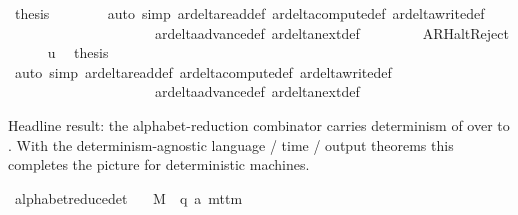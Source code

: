 \begin{isabellebody}
\ {\isacharquery}{\kern0pt}thesis\isanewline
\ \ \ \ \ \ \isamarkupfalse%
\ {\isacharparenleft}{\kern0pt}auto\ simp{\isacharcolon}{\kern0pt}\ ar{\isacharunderscore}{\kern0pt}delta{\isacharunderscore}{\kern0pt}read{\isacharunderscore}{\kern0pt}def\ ar{\isacharunderscore}{\kern0pt}delta{\isacharunderscore}{\kern0pt}compute{\isacharunderscore}{\kern0pt}def\ ar{\isacharunderscore}{\kern0pt}delta{\isacharunderscore}{\kern0pt}write{\isacharunderscore}{\kern0pt}def\isanewline
\ \ \ \ \ \ \ \ \ \ \ \ \ \ \ \ \ \ \ \ \ ar{\isacharunderscore}{\kern0pt}delta{\isacharunderscore}{\kern0pt}advance{\isacharunderscore}{\kern0pt}def\ ar{\isacharunderscore}{\kern0pt}delta{\isacharunderscore}{\kern0pt}next{\isacharunderscore}{\kern0pt}def{\isacharparenright}{\kern0pt}\isanewline
\ \ \isamarkupfalse%
\isanewline
\ \ \ \ \isamarkupfalse%
\ AR{\isacharunderscore}{\kern0pt}HaltReject\isanewline
\ \ \ \ \isamarkupfalse%
\ u{}\ \isamarkupfalse%
\ {\isacharquery}{\kern0pt}thesis\isanewline
\ \ \ \ \ \ \isamarkupfalse%
\ {\isacharparenleft}{\kern0pt}auto\ simp{\isacharcolon}{\kern0pt}\ ar{\isacharunderscore}{\kern0pt}delta{\isacharunderscore}{\kern0pt}read{\isacharunderscore}{\kern0pt}def\ ar{\isacharunderscore}{\kern0pt}delta{\isacharunderscore}{\kern0pt}compute{\isacharunderscore}{\kern0pt}def\ ar{\isacharunderscore}{\kern0pt}delta{\isacharunderscore}{\kern0pt}write{\isacharunderscore}{\kern0pt}def\isanewline
\ \ \ \ \ \ \ \ \ \ \ \ \ \ \ \ \ \ \ \ \ ar{\isacharunderscore}{\kern0pt}delta{\isacharunderscore}{\kern0pt}advance{\isacharunderscore}{\kern0pt}def\ ar{\isacharunderscore}{\kern0pt}delta{\isacharunderscore}{\kern0pt}next{\isacharunderscore}{\kern0pt}def{\isacharparenright}{\kern0pt}\isanewline
\ \ \isamarkupfalse%
\isanewline
{}\isamarkupfalse%
%
\endisatagproof
{\isafoldproof}%
%
\isadelimproof
%
\endisadelimproof
%
\begin{isamarkuptext}%
Headline result: the alphabet-reduction combinator carries
  determinism of  over to .  With the
  determinism-agnostic language / time / output theorems this completes
  the picture for deterministic machines.%
\end{isamarkuptext}\isamarkuptrue%
\isamarkupfalse%
\ alphabet{\isacharunderscore}{\kern0pt}reduce{\isacharunderscore}{\kern0pt}det{\isacharcolon}{\kern0pt}\isanewline
\ \ \ M\ {\isacharcolon}{\kern0pt}{\isacharcolon}{\kern0pt}\ {\isachardoublequoteopen}{\isacharparenleft}{\kern0pt}{\isacharprime}{\kern0pt}q{\isacharcomma}{\kern0pt}\ {\isacharprime}{\kern0pt}a{\isacharparenright}{\kern0pt}\ mttm{\isachardoublequoteclose}\isanewline

\end{isabellebody}
